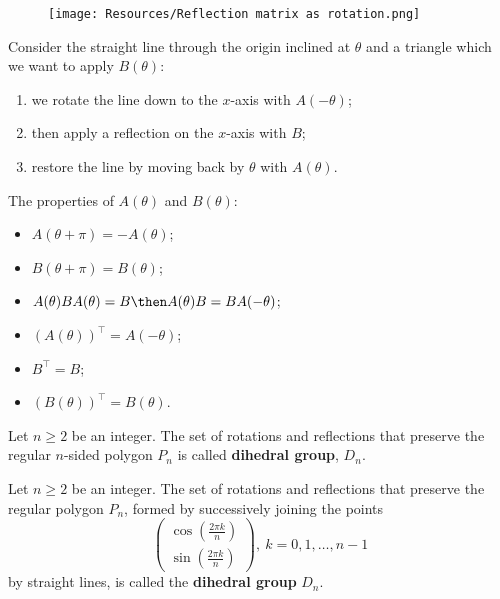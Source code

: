 \documentclass[12pt, a4paper]{article}
\begin{document}
\begin{figure}[H]
    \begin{center}
        \texttt{[image: Resources/Reflection matrix as rotation.png]}
    \end{center}
\end{figure}

Consider the straight line through the origin inclined at \(\theta\) and a triangle which we want to apply \(B(\theta)\):
\begin{enumerate}
    \item we rotate the line down to the \(x\)-axis with \(A(-\theta)\);
    \item then apply a reflection on the \(x\)-axis with \(B\);
    \item restore the line by moving back by \(\theta\) with \(A(\theta)\).
\end{enumerate}

\begin{mdprop}
    The properties of \(A(\theta)\) and \(B(\theta)\):
    \begin{itemize}
        \item \(A(\theta+\pi)=-A(\theta)\);
        \item \(B(\theta+\pi)=B(\theta)\);
        \item \(A(\theta)BA(\theta) = B \then A(\theta)B=BA(-\theta)\);
        \item \((A(\theta))^\top=A(-\theta)\);
        \item \(B^\top=B\);
        \item \((B(\theta))^\top = B(\theta)\).
    \end{itemize}
\end{mdprop}

\begin{definition}
    Let \(n\geq 2\) be an integer. The set of rotations and reflections that preserve the regular \(n\)-sided polygon \(P_n\) is called \textbf{dihedral group}, \(D_n\).
\end{definition}

\begin{mdthm}
    Let \(n \geq 2\) be an integer. The set of rotations and reflections that preserve the regular polygon \(P_n\), formed by successively joining the points
    \[\begin{pmatrix}
        \cos\left( \frac{2\pi k}{n} \right) \\
        \sin \left( \frac{2\pi k}{n} \right)
    \end{pmatrix}, \: k=0,1,\ldots, n-1\] 
    by straight lines, is called the \textbf{dihedral group} \(D_n\).
\end{mdthm}
\end{document}
